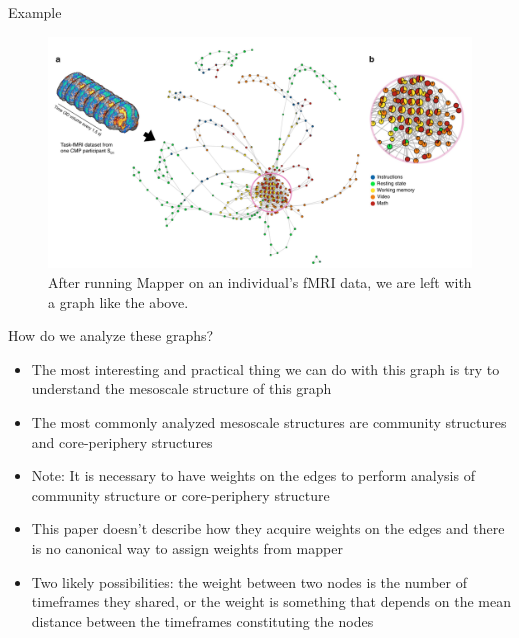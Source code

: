 \documentclass{beamer}
\begin{document}
\begin{frame}{Example}
    \begin{figure}
        \includegraphics[width = 0.8\linewidth]{fig2.png}
        \caption{After running Mapper on an individual's fMRI data, we are left with a graph like the above. }
    \end{figure}
\end{frame}

\begin{frame}{How do we analyze these graphs?}
    \begin{itemize}
        \item The most interesting and practical thing we can do with this graph is try to understand the mesoscale structure of this graph \pause
        \item The most commonly analyzed mesoscale structures are community structures and core-periphery structures \pause
        \item Note: It is necessary to have weights on the edges to perform analysis of community structure or core-periphery structure
        \item This paper doesn't describe how they acquire weights on the edges and there is no canonical way to assign weights from mapper \pause
        \item Two likely possibilities: the weight between two nodes is the number of timeframes they shared, or the weight is something that depends on the mean distance between the timeframes constituting the nodes
    \end{itemize}
\end{frame}
\end{document}
